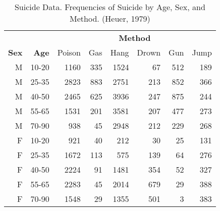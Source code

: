 \begin{table}[htb]
 \caption[Suicide Data]{Suicide Data. Frequencies of Suicide by Age, Sex, and
Method. (Heuer, 1979)}
 \label{tab:suidat}
\begin{center}
 \begin{tabular}{|rr rrrrrr|}
 \hline
      &     & \multicolumn{6}{c|}{\bfseries\large Method} \\
		        \cline{3-8}
  {\bfseries\large Sex} & {\bfseries\large Age} & Poison & Gas & Hang & Drown & Gun & Jump \\ 
   \hline 
  M & 10-20 & 1160 & 335 & 1524 &  67 & 512 & 189 \\ 
  M & 25-35 & 2823 & 883 & 2751 & 213 & 852 & 366 \\ 
  M & 40-50 & 2465 & 625 & 3936 & 247 & 875 & 244 \\ 
  M & 55-65 & 1531 & 201 & 3581 & 207 & 477 & 273 \\ 
  M & 70-90 &  938 & 45  & 2948 & 212 & 229 & 268 \\ [2mm]
  F & 10-20 &  921 &  40 & 212  &  30 & 25 & 131 \\ 
  F & 25-35 & 1672 & 113 & 575  & 139 & 64 & 276 \\ 
  F & 40-50 & 2224 &  91 & 1481 & 354 & 52 & 327 \\ 
  F & 55-65 & 2283 &  45 & 2014 & 679 & 29 & 388 \\ 
  F & 70-90 & 1548 &  29 & 1355 & 501 &  3 & 383 \\ 
 \hline
 \end{tabular}
\end{center}
\end{table}
